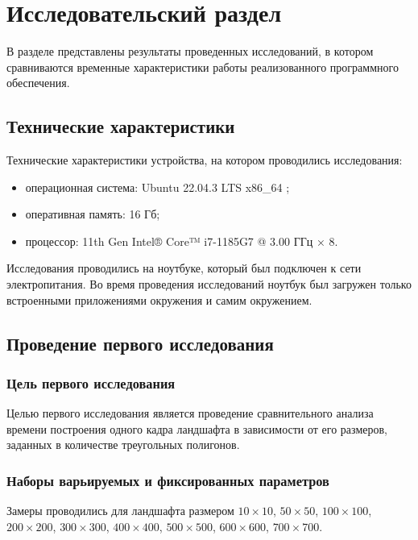 \chapter{Исследовательский раздел}

В разделе представлены результаты проведенных исследований, в котором сравниваются временные характеристики работы реализованного
программного обеспечения.

\section{Технические характеристики}

Технические характеристики устройства, на котором проводились исследования: 

\begin{itemize}[label=--]
	\item операционная система: Ubuntu 22.04.3 LTS x86\_64 \cite{info_os};
	\item оперативная память: 16 Гб;
	\item процессор: 11th Gen Intel® Core™ i7-1185G7 @ 3.00 ГГц × 8.
\end{itemize}

Исследования проводились на ноутбуке, который был подключен к сети электропитания. Во время проведения исследований ноутбук был загружен только встроенными приложениями окружения и самим окружением.

\section{Проведение первого исследования}

\subsection{Цель первого исследования}

Целью первого исследования является проведение сравнительного анализа времени построения одного кадра ландшафта в зависимости от его размеров, заданных в количестве треугольных полигонов. 

\subsection{Наборы варьируемых и фиксированных параметров}


Замеры проводились для ландшафта размером $10\times10$, $50\times50$, $100\times100$, $200\times200$, $300\times300$, $400\times400$, $500\times500$, 
$600\times600$, $700\times700$.

